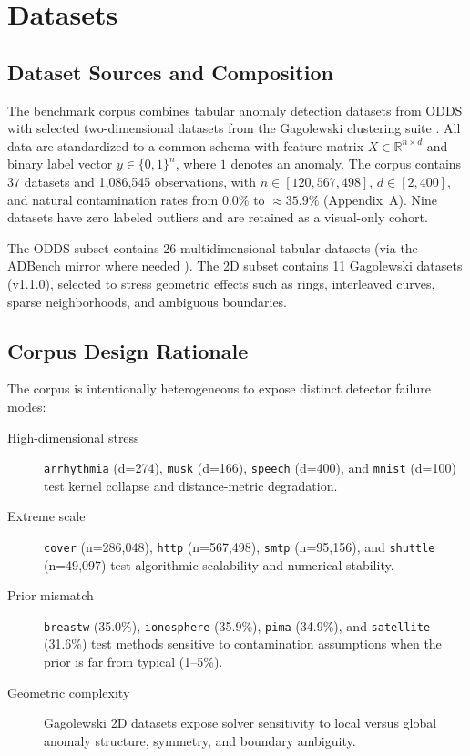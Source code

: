 \documentclass[cameraready]{Interspeech}
\begin{document}
\section{Datasets}
\label{sec:datasets}

\subsection{Dataset Sources and Composition}

The benchmark corpus combines tabular anomaly detection datasets from ODDS \cite{rayana2016odds} with selected two-dimensional datasets from the Gagolewski clustering suite \cite{gagolewski2022clustering}. All data are standardized to a common schema with feature matrix \(X \in \mathbb{R}^{n \times d}\) and binary label vector \(y \in \{0, 1\}^n\), where \(1\) denotes an anomaly. The corpus contains 37 datasets and 1{,}086{,}545 observations, with \(n \in [120, 567{,}498]\), \(d \in [2, 400]\), and natural contamination rates from \(0.0\%\) to \(\approx 35.9\%\) (Appendix~A). Nine datasets have zero labeled outliers and are retained as a visual-only cohort.

The ODDS subset contains 26 multidimensional tabular datasets (via the ADBench mirror where needed \cite{rayana2016odds}). The 2D subset contains 11 Gagolewski datasets (v1.1.0), selected to stress geometric effects such as rings, interleaved curves, sparse neighborhoods, and ambiguous boundaries.

\subsection{Corpus Design Rationale}

The corpus is intentionally heterogeneous to expose distinct detector failure modes:

\begin{description}
    \item[High-dimensional stress] \texttt{arrhythmia} (d=274), \texttt{musk} (d=166), \texttt{speech} (d=400), and \texttt{mnist} (d=100) test kernel collapse and distance-metric degradation.
    \item[Extreme scale] \texttt{cover} (n=286{,}048), \texttt{http} (n=567{,}498), \texttt{smtp} (n=95{,}156), and \texttt{shuttle} (n=49{,}097) test algorithmic scalability and numerical stability.
    \item[Prior mismatch] \texttt{breastw} (35.0\%), \texttt{ionosphere} (35.9\%), \texttt{pima} (34.9\%), and \texttt{satellite} (31.6\%) test methods sensitive to contamination assumptions when the prior is far from typical (1--5\%).
    \item[Geometric complexity] Gagolewski 2D datasets expose solver sensitivity to local versus global anomaly structure, symmetry, and boundary ambiguity.
\end{description}
\end{document}

